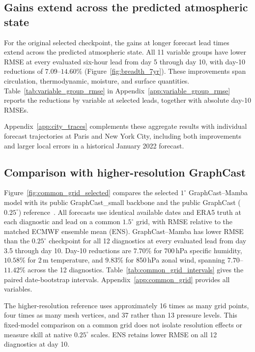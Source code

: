 \documentclass{article}
\newcommand{\suozhi}[1]{}
\renewcommand{\suozhi}[1]{}
\newcommand{\vfourchange}[1]{{\color{blue}#1}}
\begin{document}
\subsection{Gains extend across the predicted atmospheric state}
\vfourchange{For the original selected checkpoint,} the gains at longer forecast lead times extend across the predicted atmospheric state. All 11 variable groups have lower RMSE at every evaluated six-hour lead from day 5 through day 10, with day-10 reductions of \vfourchange{$7.09$--$14.60\%$} (Figure~\ref{fig:breadth_7yr}). These improvements span circulation, thermodynamic, moisture, and surface quantities. Table~\ref{tab:variable_group_rmse} in Appendix~\ref{app:variable_group_rmse} reports the reductions by variable at selected leads, together with absolute day-10 RMSEs.



Appendix~\ref{app:city_traces} complements these aggregate results with individual forecast trajectories at Paris and New York City, including both improvements and larger local errors\vfourchange{ in a historical January 2022 forecast}.

\subsection{\texorpdfstring{{Comparison with higher-resolution GraphCast}}{Comparison with higher-resolution GraphCast}}
\label{sec:common_grid}
Figure~\ref{fig:common_grid_selected} compares the \vfourchange{selected $1^\circ$} GraphCast--Mamba model with its \vfourchange{public GraphCast\_small} backbone and the \vfourchange{public} GraphCast ($0.25^\circ$) reference~\citep{lam2023graphcast}. All forecasts use identical available dates and ERA5 truth at each diagnostic and lead on a common $1.5^\circ$ grid, with RMSE relative to the matched ECMWF ensemble mean (ENS). \vfourchange{GraphCast--Mamba has lower RMSE than the $0.25^\circ$ checkpoint for all 12 diagnostics at every evaluated lead from day 3.5 through day 10. Day-10 reductions are $7.70\%$ for 700\,hPa specific humidity, $10.58\%$ for $2$\,m temperature, and $9.83\%$ for 850\,hPa zonal wind, spanning $7.70$--$11.42\%$ across the 12 diagnostics. Table~\ref{tab:common_grid_intervals} gives the paired date-bootstrap intervals.} Appendix~\ref{app:common_grid} provides all variables.

\vfourchange{The higher-resolution reference uses approximately 16 times as many grid points, four times as many mesh vertices, and 37 rather than 13 pressure levels. This fixed-model comparison on a common grid does not isolate resolution effects or measure skill at native $0.25^\circ$ scales. ENS retains lower RMSE on all 12 diagnostics at day 10.}
\suozhi{\color{blue}I think it is interesting that our GC-Mamba outperforms even the much larger model.}
\end{document}
